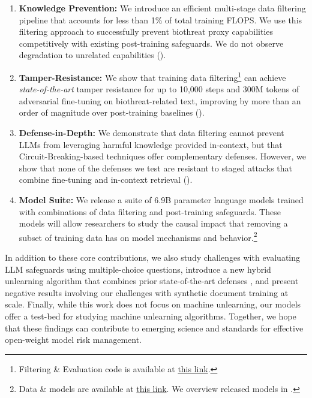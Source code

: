 \begin{enumerate}
    \item \textbf{Knowledge Prevention:} We introduce an efficient multi-stage data filtering pipeline that accounts for less than 1\% of total training FLOPS. We use this filtering approach to successfully prevent biothreat proxy capabilities competitively with existing post-training safeguards. We do not observe degradation to unrelated capabilities
    ().
    \item \textbf{Tamper-Resistance:} We show that training data filtering\footnote{Filtering \& Evaluation code is available at \href{https://github.com/EleutherAI/deep-ignorance}{this link}.} can achieve \textit{state-of-the-art} tamper resistance for up to 10,000 steps and 300M tokens of adversarial fine-tuning on biothreat-related text, improving by more than an order of magnitude over post-training baselines ().
    \item \textbf{Defense-in-Depth:} We demonstrate that data filtering cannot prevent LLMs from leveraging harmful knowledge provided in-context, but that Circuit-Breaking-based techniques \citep{zou2024improving} offer complementary defenses. However, we show that none of the defenses we test are resistant to staged attacks that combine fine-tuning and in-context retrieval ().
    \item \textbf{Model Suite:} We release a suite of 6.9B parameter language models trained with combinations of data filtering and post-training safeguards. 
    These models will allow researchers to study the causal impact that removing a subset of training data has on model mechanisms and behavior.\footnote{Data \& models are available at \href{https://huggingface.co/collections/EleutherAI/deep-ignorance-685441040d024a0fee593d68}{this link}. We overview released models in .}
\end{enumerate}

In addition to these core contributions, we also study challenges with evaluating LLM safeguards using multiple-choice questions, introduce a new hybrid unlearning algorithm that combines prior state-of-the-art defenses \citep{zou2024improving, sheshadri2024latent}, and present negative results involving our challenges with synthetic document training \citep{anthropic2025modifying} at scale. 
Finally, while this work does not focus on machine unlearning, our models offer a test-bed for studying machine unlearning algorithms.
Together, we hope that these findings can contribute to emerging science and standards for effective open-weight model risk management. 

